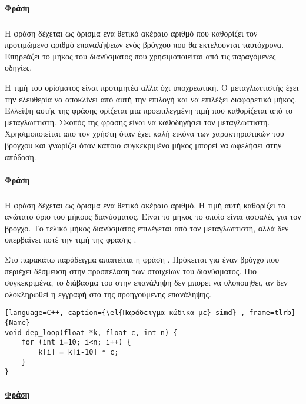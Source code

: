 \paragraph{\underline{Φράση }}
\subparagraph{}
Η φράση \emph{} δέχεται ως όρισμα ένα θετικό ακέραιο αριθμό που καθορίζει τον προτιμώμενο αριθμό επαναλήψεων
ενός βρόγχου που θα εκτελούνται ταυτόχρονα. Επηρεάζει το μήκος του διανύσματος που χρησιμοποιείται από τις παραγόμενες
\emph{} οδηγίες.

Η τιμή του ορίσματος είναι προτιμητέα αλλα όχι υποχρεωτική. Ο μεταγλωττιστής έχει την ελευθερία να αποκλίνει από αυτή
την επιλογή και να επιλέξει διαφορετικό μήκος. Ελλείψη αυτής της φράσης ορίζεται μια προεπιλεγμένη τιμή που καθορίζεται
από το μεταγλωττιστή. Σκοπός της φράσης \emph{} είναι να καθοδηγήσει τον μεταγλωττιστή. Χρησιμοποιείται από
τον χρήστη όταν έχει καλή εικόνα των χαρακτηριστικών του βρόγχου και γνωρίζει όταν κάποιο συγκεκριμένο μήκος μπορεί να
ωφελήσει στην απόδοση.

\paragraph{\underline{Φράση }}
\subparagraph{}
Η φράση \emph{} δέχεται ως όρισμα ένα θετικό ακέραιο αριθμό. Η τιμή αυτή καθορίζει το ανώτατο όριο του
μήκους διανύσματος. Είναι το μήκος το οποίο είναι ασφαλές για τον βρόγχο. Το τελικό μήκος διανύσματος επιλέγεται από τον
μεταγλωττιστή, αλλά δεν υπερβαίνει ποτέ την τιμή της φράσης \emph{}.

Στο παρακάτω παράδειγμα απαιτείται η φράση \emph{}. Πρόκειται για έναν βρόγχο που περιέχει δέσμευση στην
προσπέλαση των στοιχείων του διανύσματος. Πιο συγκεκριμένα, το διάβασμα του \emph{\en{[i-10]}} στην επανάληψη
\emph{} δεν μπορεί να υλοποιηθει, αν δεν ολοκληρωθεί η εγγραφή στο \emph{} της προηγούμενης επανάληψης.
 

\begin{lstlisting}[language=C++, caption={\el{Παράδειγμα κώδικα με} simd} , frame=tlrb]{Name}
void dep_loop(float *k, float c, int n) {
	for (int i=10; i<n; i++) {
		k[i] = k[i-10] * c;
	}
}
\end{lstlisting}

\paragraph{\underline{Φράση }}
\subparagraph{}

